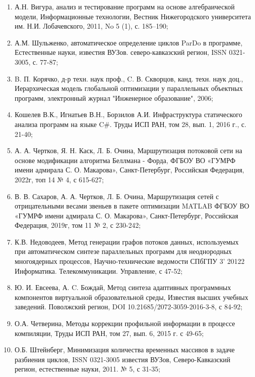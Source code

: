 \begin{enumerate}
    \item А.Н. Вигура, анализ и тестирование программ на основе алгебраической модели, Информационные технологии, Вестник Нижегородского университета им. Н.И. Лобачевского, 2011, No 5 (1), с. 185–190;
    \item А.М. Шульженко, автоматическое определение циклов ParDo в программе, Естественные науки, известия ВУЗов. северо-кавказский регион, ISSN 0321-3005, с. 77-87;
    \item B. П. Корячко, д-р техн. наук проф., C. В. Скворцов, канд. техн. наук доц., Иерархическая модель глобальной оптимизации у параллельных объектных программ, электронный журнал "Инженерное образование", 2006; 
    \item Кошелев В.К., Игнатьев В.Н., Борзилов А.И. Инфраструктура статического анализа программ на языке C\#. Труды ИСП РАН, том 28, вып. 1, 2016 г., с. 21-40;
    \item А. А. Чертков, Я. Н. Каск, Л. Б. Очина, Маршрутизация потоковой сети на основе модификации алгоритма Беллмана - Форда, ФГБОУ ВО «ГУМРФ имени адмирала С. О. Макарова», Санкт-Петербург, Российская Федерация, 2022г, топ 14 № 4, с 615-627;
    \item В. В. Сахаров, А. А. Чертков, Л. Б. Очина, Маршрутизация сетей с отрицательными весами звеньев в пакете оптимизации MATLAB ФГБОУ ВО «ГУМРФ имени адмирала С. О. Макарова», Санкт-Петербург, Российская Федерация, 2019г, том 11 № 2, с 230-242;
    \item К.В. Недоводеев, Метод генерации графов потоков данных, используемых при автоматическом синтезе параллельных программ для неоднородных многоядерных процессов, Научно-технические ведомости СПбГПУ 3' 20122 Информатика. Телекоммуникации. Управление, с 47-52;
    \item Ю. И. Евсеева, А. C. Бождай, Метод синтеза адаптивных программных компонентов виртуальной образовательной среды, Известия высших учебных заведений. Поволжский регион, DOI 10.21685/2072-3059-2016-3-8, с 84-92;
    \item О.А. Четверина, Методы коррекции профильной информации в процессе компиляции, Труды ИСП РАН, том 27, вып. 6, 2015 г. с 49-65;
    \item О.Б. Штейнберг, Минимизация количества временных массивов в задаче разбиения циклов, ISSN 0321-3005 известия ВУЗов, Северо-Кавказский регион, естественные науки, 2011. № 5, с 31-35;

\end{enumerate}
